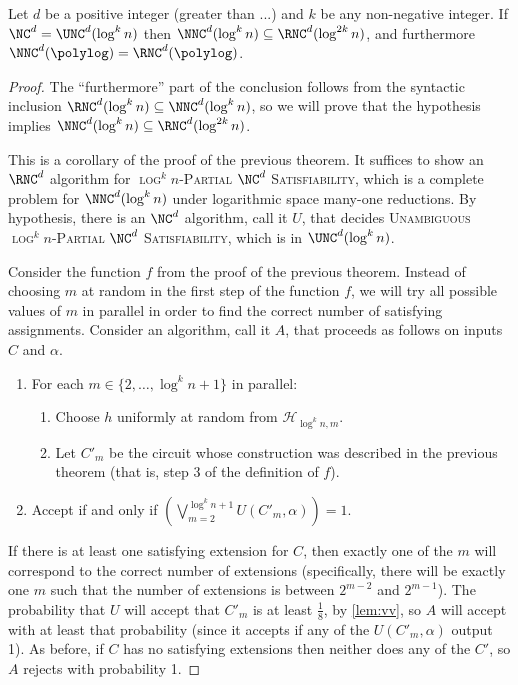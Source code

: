 \documentclass{article}
\newcommand{\PSAT}{\textsc{$\log^k n$-Partial $\NC^d$ Satisfiability}}
\newcommand{\UPSAT}{\textsc{Unambiguous $\log^k n$-Partial $\NC^d$ Satisfiability}}
\begin{document}
\begin{corollary}
  Let $d$ be a positive integer (greater than ...) and $k$ be any non-negative integer.
  If $\NC^d = \UNC^d(\log^k n)$ then $\NNC^d(\log^k n) \subseteq \RNC^d(\log^{2k} n)$, and furthermore $\NNC^d(\polylog) = \RNC^d(\polylog)$.
\end{corollary}
\begin{proof}
  The ``furthermore'' part of the conclusion follows from the syntactic inclusion $\RNC^d(\log^k n) \subseteq \NNC^d(\log^k n)$, so we will prove that the hypothesis implies $\NNC^d(\log^k n) \subseteq \RNC^d(\log^{2k} n)$.

  This is a corollary of the proof of the previous theorem.
  It suffices to show an $\RNC^d$ algorithm for \PSAT{}, which is a complete problem for $\NNC^d(\log^k n)$ under logarithmic space many-one reductions.
  By hypothesis, there is an $\NC^d$ algorithm, call it $U$, that decides \UPSAT{}, which is in $\UNC^d(\log^k n)$.

  Consider the function $f$ from the proof of the previous theorem.
  Instead of choosing $m$ at random in the first step of the function $f$, we will try all possible values of $m$ in parallel in order to find the correct number of satisfying assignments.
  Consider an algorithm, call it $A$, that proceeds as follows on inputs $C$ and $\alpha$.
  \begin{enumerate}
  \item For each $m \in \{2, \dotsc, \log^k n + 1\}$ in parallel:
    \begin{enumerate}
    \item Choose $h$ uniformly at random from $\mathcal{H}_{\log^k n, m}$.
    \item Let $C'_m$ be the circuit whose construction was described in the previous theorem (that is, step 3 of the definition of $f$).
    \end{enumerate}
  \item Accept if and only if $\left(\bigvee_{m=2}^{\log^k n + 1} U(C'_m, \alpha)\right) = 1$.
  \end{enumerate}
  If there is at least one satisfying extension for $C$, then exactly one of the $m$ will correspond to the correct number of extensions (specifically, there will be exactly one $m$ such that the number of extensions is between $2^{m - 2}$ and $2^{m - 1}$).
  The probability that $U$ will accept that $C'_m$ is at least $\frac{1}{8}$, by \autoref{lem:vv}, so $A$ will accept with at least that probability (since it accepts if any of the $U(C'_m, \alpha)$ output 1).
  As before, if $C$ has no satisfying extensions then neither does any of the $C'$, so $A$ rejects with probability 1.


\end{proof}
\end{document}
